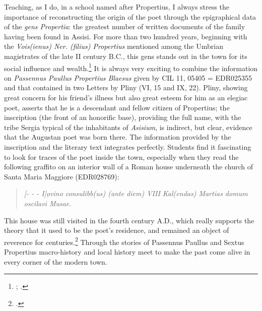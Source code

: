 \documentclass[amsthm,ebook]{saparticle}
\begin{document}
Teaching, as I do, in a school named after Propertius, I always stress the importance of reconstructing the origin of
the poet through the epigraphical data of the \emph{gens Propertia}: the greatest number of written documents of the family
having been found in Assisi. For more than two hundred years, beginning with the \emph{Vois(ienus) Ner. (filius) Propertius}
mentioned among the Umbrian magistrates of the late II century B.C., this gens stands out in the town for its social
influence and wealth.\footnote{\citet{Forni1986}; \citet{Zuddas2006}.} It is always very exciting to combine the information on
\emph{Passennus Paullus Propertius Blaesus }given by CIL 11, 05405 = EDR025355 and that contained in two Letters by Pliny (VI,
15 and IX, 22). Pliny, showing great concern for his friend’s illness but also great esteem for him as an elegiac poet,
asserts that he is a descendant and fellow citizen of Propertius; the inscription (the front of an honorific base),
providing the full name, with the tribe Sergia typical of the inhabitants of \emph{Asisium}, is indirect, but clear, evidence
that the Augustan poet was born there. The information provided by the inscription and the literary text integrates
perfectly. Students find it fascinating to look for traces of the poet inside the town, especially when they read the
following graffito on an interior wall of a Roman house underneath the church of Santa Maria Maggiore (EDR028769):

\begin{quotation}

\emph{[{}- - - I]ọvino consulibb(us) (ante diem) VIII Kal(endas) Martias domum oscilavi Musae.}
\end{quotation}

This house was still visited in the fourth century A.D., which really supports the theory that it used to be the poet’s
residence, and remained an object of reverence for centuries.\footnote{\citet[244-246]{Boldrighini2014}.} Through the stories
of Passennus Paullus and Sextus Propertius macro-history and local history meet to make the past come alive in every
corner of the modern town.



\end{document}
